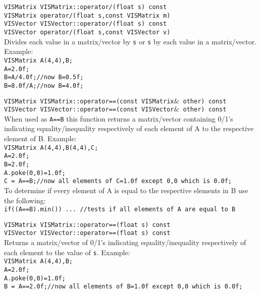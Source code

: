 \begin{description}
{\tt VISMatrix VISMatrix::operator/(float s) const}\\
{\tt VISMatrix operator/(float s,const VISMatrix m)}\\
{\tt VISVector VISVector::operator/(float s) const}\\
{\tt VISVector operator/(float s,const VISVector v)}\\
Divides each value in a matrix/vector by {\tt s}
or {\tt s} by each value in a matrix/vector.\\
Example:\\
{\tt VISMatrix A(4,4),B;\\
A=2.0f;\\
B=A/4.0f;//now B=0.5f;\\
B=8.0f/A;//now B=4.0f;}
\item[{\tt operator==(other)} --]
{\tt VISMatrix VISMatrix::operator==(const VISMatrix$\&$ other) const}\\
{\tt VISVector VISVector::operator==(const VISVector$\&$ other) const}\\
When used as {\tt A==B} this function returns a matrix/vector containing
0/1's indicating equality/inequality respectively
of each element of A to the respective
element of B.  Example:\\
{\tt VISMatrix A(4,4),B(4,4),C;}\\
{\tt A=2.0f;}\\
{\tt B=2.0f;}\\
{\tt A.poke(0,0)=1.0f;}\\
{\tt C = A==B;//now all elements of C=1.0f except 0,0 which is 0.0f;}\\
To determine if every element of A is equal to the
respective elements in B use the following:\\
{\tt if((A==B).min()) ... //tests if all elements of A are equal to B}
\item[{\tt operator==(s)} --]
{\tt VISMatrix VISMatrix::operator==(float s) const}\\
{\tt VISVector VISVector::operator==(float s) const}\\
Returns a matrix/vector of 0/1's indicating equality/inequality respectively
of each element
to the value of {\tt s}.  Example:\\
{\tt VISMatrix A(4,4),B;}\\
{\tt A=2.0f;}\\
{\tt A.poke(0,0)=1.0f;}\\
{\tt B = A==2.0f;//now all elements of B=1.0f except 0,0 which is 0.0f;}\\

\end{description}
